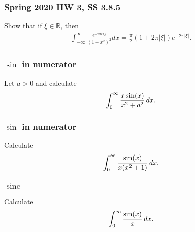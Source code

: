 \hypertarget{spring-2020-hw-3-ss-3.8.5}{%
\subsubsection{Spring 2020 HW 3, SS
3.8.5}\label{spring-2020-hw-3-ss-3.8.5}}

Show that if \(\xi\in {\mathbb{R}}\), then
\begin{align*}
\int_{-\infty}^{\infty} \frac{e^{-2 \pi i x \xi}}{\left(1+x^{2}\right)^{2}} d x=\frac{\pi}{2}(1+2 \pi|\xi|) e^{-2 \pi|\xi|}
.\end{align*}

\hypertarget{sin-in-numerator}{%
\subsubsection{\texorpdfstring{\(\sin\) in
numerator}{\textbackslash sin in numerator}}\label{sin-in-numerator}}

\begin{problem}[?]

Let \(a>0\) and calculate
\begin{align*}
\int_0^\infty {x\sin(x) \over x^2 + a^2} \,dx
.\end{align*}

\end{problem}

\hypertarget{sin-in-numerator-1}{%
\subsubsection{\texorpdfstring{\(\sin\) in
numerator}{\textbackslash sin in numerator}}\label{sin-in-numerator-1}}

\begin{problem}[?]

Calculate
\begin{align*}
\int_0^\infty {\sin(x) \over x(x^2+1)}\, dx
.\end{align*}

\end{problem}

\hypertarget{operatornamesinc}{%
\subsubsection{\texorpdfstring{\(\operatorname{sinc}\)}{\textbackslash operatorname\{sinc\}}}\label{operatornamesinc}}

\begin{problem}[?]

Calculate
\begin{align*}
\int_0^\infty {\sin(x) \over x}\, dx
.\end{align*}

\end{problem}

